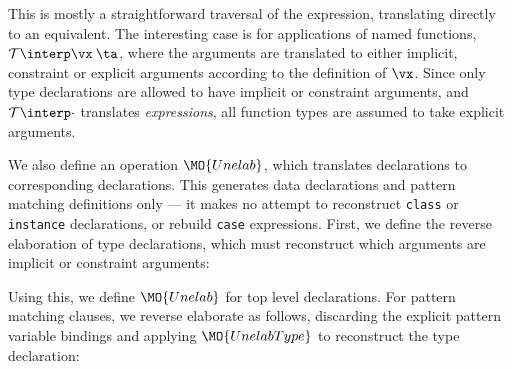 \noindent
This is mostly a straightforward
traversal of the \TT{} expression, translating directly to an \Idris{} equivalent.
The interesting case is for applications of named functions,
$\uninterp{\vx\:\ta}$, where the arguments are translated to either implicit,
constraint or explicit arguments according to the definition of $\vx$.
Since only type declarations are allowed to have implicit or constraint arguments,
and $\uninterp{\cdot}$ translates \emph{expressions},
all function types are assumed to take explicit arguments.

We also define an operation $\MO{Unelab}$, which translates \TT{} declarations
to corresponding \Idris{} declarations. This generates data declarations and
pattern matching definitions only --- it makes no attempt to reconstruct 
\texttt{class}
or \texttt{instance} declarations, or rebuild \texttt{case} expressions.
First, we define the reverse elaboration of type declarations, which must reconstruct
which arguments are implicit or constraint arguments:


\noindent
Using this, we define $\MO{Unelab}$ for top level declarations. For pattern
matching clauses, we reverse elaborate as follows, discarding the explicit
pattern variable bindings and applying $\MO{UnelabType}$ to reconstruct
the type declaration:


